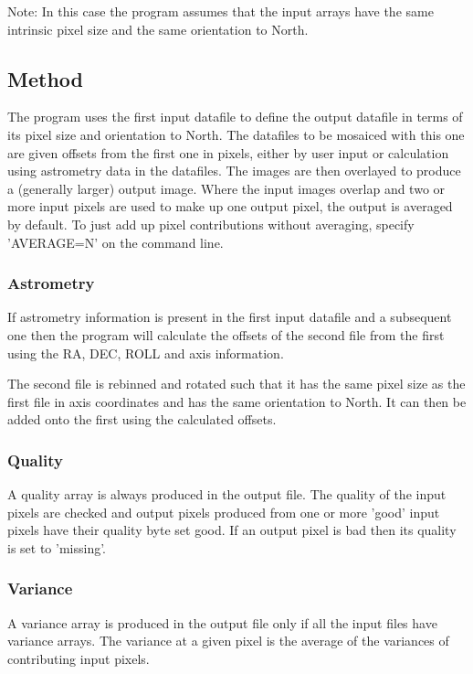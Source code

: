 \documentclass{book}
\renewcommand{\_}{{\tt\char'137}}     %
\begin{document}
Note: In this case the program assumes that the input arrays have the
same intrinsic pixel size and the same orientation to North.

\subsection{Method}
The program uses the first input datafile to define the output
datafile in terms of its pixel size and orientation to North.
The datafiles to be mosaiced with this one are given offsets from
the first one in pixels, either by user input or calculation using
astrometry data in the datafiles. The images are then overlayed to
produce a (generally larger) output image. Where the input images
overlap and two or more input pixels are used to make up one output
pixel, the output is averaged by default. To just add up pixel
contributions without averaging, specify 'AVERAGE=N' on the command
line.

\subsubsection{Astrometry}
If astrometry information is present in the first input datafile and
a subsequent one then the program will calculate the offsets of the
second file from the first using the RA, DEC, ROLL and axis
information.

The second file is rebinned and rotated such that it has the same pixel
size as the first file in axis coordinates and has the same orientation
to North. It can then be added onto the first using the calculated
offsets.

\subsubsection{Quality}
A quality array is always produced in the output file. The quality of
the input pixels are checked and output pixels produced from one or
more 'good' input pixels have their quality byte set good. If an output
pixel is bad then its quality is set to 'missing'.

\subsubsection{Variance}
A variance array is produced in the output file only if all the input
files have variance arrays. The variance at a given pixel is the average
of the variances of contributing input pixels.
\end{document}
